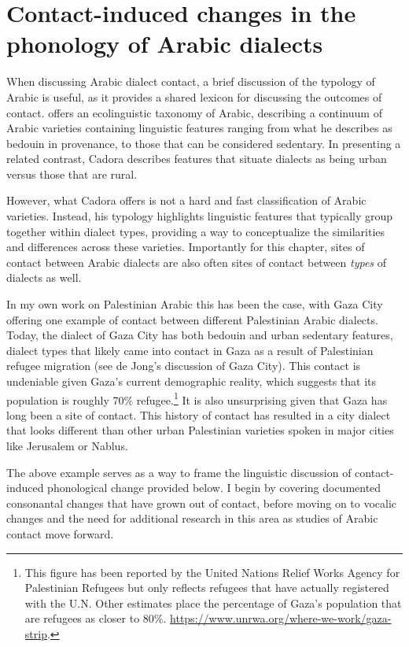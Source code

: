 \documentclass[output=paper]{langsci/langscibook}
\begin{document}
\section{Contact-induced changes in the phonology of Arabic dialects}

When discussing Arabic dialect contact, a brief discussion of the typology of Arabic is useful, as it provides a shared lexicon for discussing the outcomes of contact. \citet{Cadora1992} offers an ecolinguistic taxonomy of Arabic, describing a continuum of Arabic varieties containing linguistic features ranging from what he describes as bedouin in provenance, to those that can be considered sedentary. In presenting a related contrast, Cadora describes features that situate dialects as being urban versus those that are rural. 

  However, what Cadora offers is not a hard and fast classification of Arabic varieties. Instead, his typology highlights linguistic features that typically group together within dialect types, providing a way to conceptualize the similarities and differences across these varieties. Importantly for this chapter, sites of contact between Arabic dialects are also often sites of contact between \textit{types} of dialects as well. 

  In my own work on Palestinian Arabic this has been the case, with Gaza City offering one example of contact between different Palestinian Arabic dialects. Today, the dialect of Gaza City has both bedouin and urban sedentary features, dialect types that likely came into contact in Gaza as a result of Palestinian refugee migration (see de Jong's \citeyear{DeJong2000} discussion of Gaza City). This contact is undeniable given Gaza’s current demographic reality, which suggests that its population is roughly 70\% refugee.\footnote{This figure has been reported by the United Nations Relief Works Agency for Palestinian Refugees but only reflects refugees that have actually registered with the U.N. Other estimates place the percentage of Gaza’s population that are refugees as closer to 80\%. \url{https://www.unrwa.org/where-we-work/gaza-strip}.}  It is also unsurprising given that Gaza has long been a site of contact. This history of contact has resulted in a city dialect that looks different than other urban Palestinian varieties spoken in major cities like Jerusalem or Nablus. 

  The above example serves as a way to frame the linguistic discussion of contact-induced phonological change provided below. I begin by covering documented consonantal changes that have grown out of contact, before moving on to vocalic changes and the need for additional research in this area as studies of Arabic contact move forward. 
\end{document}
